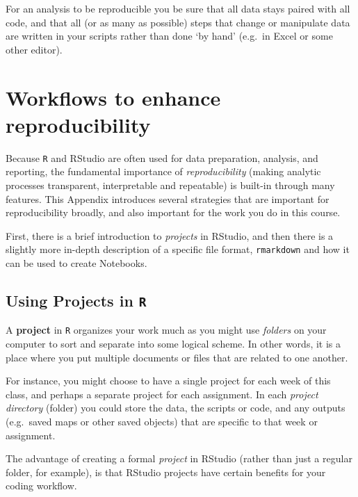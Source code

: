 \documentclass[
]{book}
\begin{document}
For an analysis to be reproducible you be sure that all data stays paired with all code, and that all (or as many as possible) steps that change or manipulate data are written in your scripts rather than done `by hand' (e.g.~in Excel or some other editor).

\hypertarget{workflows-to-enhance-reproducibility}{%
\section{Workflows to enhance reproducibility}\label{workflows-to-enhance-reproducibility}}

Because \texttt{R} and RStudio are often used for data preparation, analysis, and reporting, the fundamental importance of \emph{reproducibility} (making analytic processes transparent, interpretable and repeatable) is built-in through many features. This Appendix introduces several strategies that are important for reproducibility broadly, and also important for the work you do in this course.

First, there is a brief introduction to \emph{projects} in RStudio, and then there is a slightly more in-depth description of a specific file format, \texttt{rmarkdown} and how it can be used to create Notebooks.

\hypertarget{using-projects-in-r}{%
\subsection{\texorpdfstring{Using Projects in \texttt{R}}{Using Projects in R}}\label{using-projects-in-r}}

A \textbf{project} in \texttt{R} organizes your work much as you might use \emph{folders} on your computer to sort and separate into some logical scheme. In other words, it is a place where you put multiple documents or files that are related to one another.

For instance, you might choose to have a single project for each week of this class, and perhaps a separate project for each assignment. In each \emph{project directory} (folder) you could store the data, the scripts or code, and any outputs (e.g.~saved maps or other saved objects) that are specific to that week or assignment.

The advantage of creating a formal \emph{project} in RStudio (rather than just a regular folder, for example), is that RStudio projects have certain benefits for your coding workflow.
\end{document}
